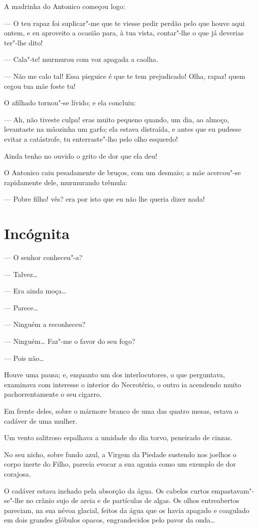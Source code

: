 A madrinha do Antonico começou logo:

--- O teu rapaz foi suplicar"-me que te viesse pedir perdão pelo que
houve aqui ontem, e eu aproveito a ocasião para, à tua vista, contar"-lhe
o que já deverias ter"-lhe dito!

--- Cala"-te! murmurou com voz apagada a caolha.

--- Não me calo tal! Essa pieguice é que te tem prejudicado! Olha,
rapaz! quem cegou tua mãe foste tu!

O afilhado tornou"-se lívido; e ela concluiu:

--- Ah, não tiveste culpa! eras muito pequeno quando, um dia, ao almoço,
levantaste na mãozinha um garfo; ela estava distraída, e antes que eu
pudesse evitar a catástrofe, tu enterraste"-lho pelo olho esquerdo!

Ainda tenho no ouvido o grito de dor que ela deu!

O Antonico caiu pesadamente de bruços, com um desmaio; a mãe acercou"-se
rapidamente dele, murmurando trêmula:

--- Pobre filho! vês? era por isto que eu não lhe queria dizer nada!

\chapter{Incógnita}

--- O senhor conheceu"-a?

--- Talvez\ldots{}

--- Era ainda moça\ldots{}

--- Parece\ldots{}

--- Ninguém a reconheceu?

--- Ninguém\ldots{} Faz"-me o favor do seu fogo?

--- Pois não\ldots{}

Houve uma pausa; e, enquanto um dos interlocutores, o que perguntava,
examinava com interesse o interior do Necrotério, o outro ia acendendo
muito pachorrentamente o seu cigarro.

Em frente deles, sobre o mármore branco de uma das quatro mesas, estava
o cadáver de uma mulher.

Um vento salitroso espalhava a umidade do dia torvo, peneirado de
cinzas.

No seu nicho, sobre fundo azul, a Virgem da Piedade sustendo nos joelhos
o corpo inerte do Filho, parecia evocar a sua agonia como um exemplo de
dor corajosa.

O cadáver estava inchado pela absorção da água. Os cabelos curtos
empastavam"-se"-lhe no crânio sujo de areia e de partículas de algas. Os
olhos entreabertos pareciam, na sua névoa glacial, feitos da água que os
havia apagado e coagulado em dois grandes glóbulos opacos, engrandecidos
pelo pavor da onda\ldots{}

